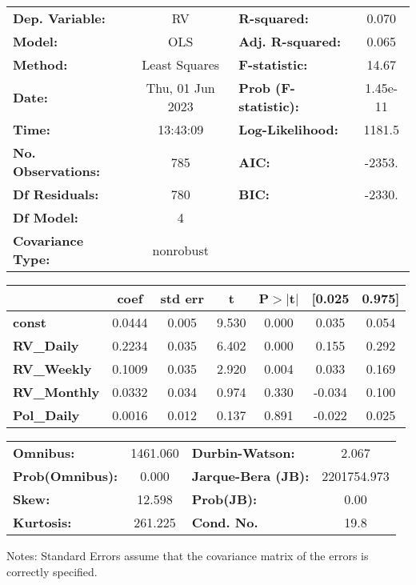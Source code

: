 \begin{center}
\begin{tabular}{lclc}
\toprule
\textbf{Dep. Variable:}    &        RV        & \textbf{  R-squared:         } &      0.070   \\
\textbf{Model:}            &       OLS        & \textbf{  Adj. R-squared:    } &      0.065   \\
\textbf{Method:}           &  Least Squares   & \textbf{  F-statistic:       } &      14.67   \\
\textbf{Date:}             & Thu, 01 Jun 2023 & \textbf{  Prob (F-statistic):} &   1.45e-11   \\
\textbf{Time:}             &     13:43:09     & \textbf{  Log-Likelihood:    } &     1181.5   \\
\textbf{No. Observations:} &         785      & \textbf{  AIC:               } &     -2353.   \\
\textbf{Df Residuals:}     &         780      & \textbf{  BIC:               } &     -2330.   \\
\textbf{Df Model:}         &           4      & \textbf{                     } &              \\
\textbf{Covariance Type:}  &    nonrobust     & \textbf{                     } &              \\
\bottomrule
\end{tabular}
\begin{tabular}{lcccccc}
                     & \textbf{coef} & \textbf{std err} & \textbf{t} & \textbf{P$> |$t$|$} & \textbf{[0.025} & \textbf{0.975]}  \\
\midrule
\textbf{const}       &       0.0444  &        0.005     &     9.530  &         0.000        &        0.035    &        0.054     \\
\textbf{RV\_Daily}   &       0.2234  &        0.035     &     6.402  &         0.000        &        0.155    &        0.292     \\
\textbf{RV\_Weekly}  &       0.1009  &        0.035     &     2.920  &         0.004        &        0.033    &        0.169     \\
\textbf{RV\_Monthly} &       0.0332  &        0.034     &     0.974  &         0.330        &       -0.034    &        0.100     \\
\textbf{Pol\_Daily}  &       0.0016  &        0.012     &     0.137  &         0.891        &       -0.022    &        0.025     \\
\bottomrule
\end{tabular}
\begin{tabular}{lclc}
\textbf{Omnibus:}       & 1461.060 & \textbf{  Durbin-Watson:     } &      2.067   \\
\textbf{Prob(Omnibus):} &   0.000  & \textbf{  Jarque-Bera (JB):  } & 2201754.973  \\
\textbf{Skew:}          &  12.598  & \textbf{  Prob(JB):          } &       0.00   \\
\textbf{Kurtosis:}      & 261.225  & \textbf{  Cond. No.          } &       19.8   \\
\bottomrule
\end{tabular}
\end{center}

Notes: \newline
 [1] Standard Errors assume that the covariance matrix of the errors is correctly specified.